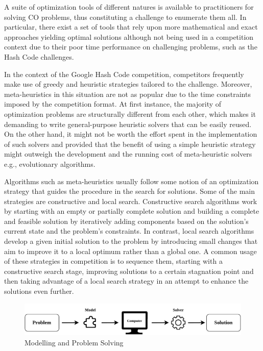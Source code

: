 A suite of optimization tools of different natures is available to practitioners
for solving CO problems, thus constituting a challenge to enumerate them all. In
particular, there exist a set of tools that rely upon more mathematical and
exact approaches yielding optimal solutions although not being used in a
competition context due to their poor time performance on challenging problems,
such as the Hash Code challenges.

In the context of the Google Hash Code competition, competitors frequently make
use of greedy and heuristic strategies tailored to the challenge.  Moreover,
meta-heuristics in this situation are not as popular due to the time constraints
imposed by the competition format. At first instance, the majority of
optimization problems are structurally different from each other, which makes it
demanding to write general-purpose heuristic solvers that can be easily reused.
On the other hand, it might not be worth the effort spent in the implementation
of such solvers and provided that the benefit of using a simple heuristic
strategy might outweigh the development and the running cost of meta-heuristic
solvers e.g., evolutionary algorithms.

Algorithms such as meta-heuristics usually follow some notion of an optimization
strategy that guides the procedure in the search for solutions.  Some of the
main strategies are constructive and local search.  Constructive search
algorithms work by starting with an empty or partially complete solution and
building a complete and feasible solution by iteratively adding components based
on the solution's current state and the problem's constraints.  In contrast,
local search algorithms develop a given initial solution to the problem by
introducing small changes that aim to improve it to a local optimum rather than
a global one.  A common usage of these strategies in competition is to sequence
them, starting with a constructive search stage, improving solutions to a
certain stagnation point and then taking advantage of a local search strategy in
an attempt to enhance the solutions even further.

\begin{figure}[h]
      \centering
      \includegraphics[width=\textwidth,keepaspectratio]{../assets/modelling/modelling.pdf}
      \caption{Modelling and Problem Solving}
      \label{fig:problem-solving}
\end{figure}

